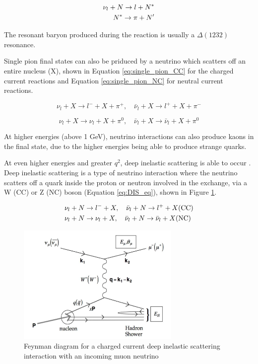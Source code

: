 \begin{align}
\nu_{l}+N \rightarrow l+N^{*}\label{eq:resonant_pion} \\
N^{*} \rightarrow \pi+N^{\prime} \notag
\end{align}


The resonant baryon produced during the reaction is usually a $\Delta(1232)$ resonance. 

Single pion final states can also be priduced by a neutrino which scatters off an entire nucleus (X), shown in Equation \ref{eq:single_pion_CC} for the charged current reactions and Equation \ref{eq:single_pion_NC} for neutral current reactions. 

\begin{equation}
\nu_{l}+X \rightarrow l^{-}+X+\pi^{+}, \quad \bar{\nu}_{l}+X \rightarrow l^{+}+X+\pi^{-}
\label{eq:single_pion_CC}
\end{equation}

\begin{equation}
\nu_{l}+X \rightarrow \nu_{l}+X+\pi^{0}, \quad \bar{\nu}_{l}+X \rightarrow \bar{\nu}_{l}+X+\pi^{0}
\label{eq:single_pion_NC}
\end{equation}

At higher energies (above 1 GeV), neutrino interactions can also produce kaons in the final state, due to the higher energies being able to produce strange quarks. 

At even higher energies and greater $q^2$, deep inelastic scattering is able to occur \cite{kulagin2007neutrino}. Deep inelastic scattering is a type of neutrino interaction where the neutrino scatters off a quark inside the proton or neutron involved in the exchange, via a W (CC) or Z (NC) boson (Equation \ref{eq:DIS_eq}), shown in Figure \ref{fig:CC_DIS}.


\begin{align}
&\nu_{l}+N \rightarrow l^{-}+X, \quad \bar{\nu}_{l}+N \rightarrow l^{+}+X(\mathrm{CC}) \label{eq:DIS_eq}\\
&\nu_{l}+N \rightarrow \nu_{l}+X, \quad \bar{\nu}_{l}+N \rightarrow \bar{\nu}_{l}+X(\mathrm{NC}) \notag
\end{align}


\begin{figure}
    \centering
    \includegraphics[width=0.7\textwidth]{Figures/CC_DIS.png}
    \caption{Feynman diagram for a charged current deep inelastic scattering interaction with an incoming muon neutrino}
    \label{fig:CC_DIS}
\end{figure}

